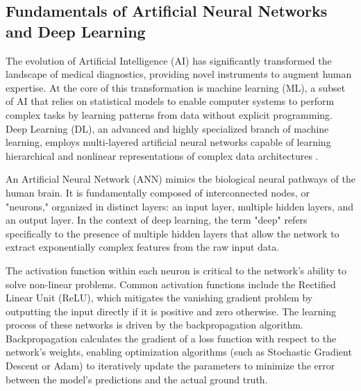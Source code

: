 \subsection{Fundamentals of Artificial Neural Networks and Deep Learning}
\par The evolution of Artificial Intelligence (AI) has significantly transformed the landscape of medical diagnostics, providing novel instruments to augment human expertise. At the core of this transformation is machine learning (ML), a subset of AI that relies on statistical models to enable computer systems to perform complex tasks by learning patterns from data without explicit programming. Deep Learning (DL), an advanced and highly specialized branch of machine learning, employs multi-layered artificial neural networks capable of learning hierarchical and nonlinear representations of complex data architectures \cite{lecun2015deep}.
\par An Artificial Neural Network (ANN) mimics the biological neural pathways of the human brain. It is fundamentally composed of interconnected nodes, or "neurons," organized in distinct layers: an input layer, multiple hidden layers, and an output layer. In the context of deep learning, the term "deep" refers specifically to the presence of multiple hidden layers that allow the network to extract exponentially complex features from the raw input data.
\par The activation function within each neuron is critical to the network's ability to solve non-linear problems. Common activation functions include the Rectified Linear Unit (ReLU), which mitigates the vanishing gradient problem by outputting the input directly if it is positive and zero otherwise. The learning process of these networks is driven by the backpropagation algorithm. Backpropagation calculates the gradient of a loss function with respect to the network's weights, enabling optimization algorithms (such as Stochastic Gradient Descent or Adam) to iteratively update the parameters to minimize the error between the model's predictions and the actual ground truth.

